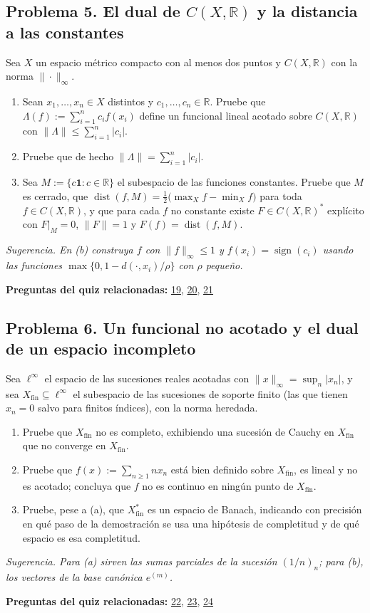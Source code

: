 \documentclass[11pt,a4paper]{article}
\begin{document}
\subsection*{\hypertarget{prob-5}{}Problema 5. El dual de $C(X,\mathbb{R})$ y la distancia a las constantes}
Sea $X$ un espacio métrico compacto con al menos dos puntos y $C(X,\mathbb{R})$ con la norma $\|\cdot\|_\infty$.
\begin{enumerate}[label=(\alph*),leftmargin=2.2em,itemsep=2pt]
\item[(a)] Sean $x_1,\dots,x_n\in X$ distintos y $c_1,\dots,c_n\in\mathbb{R}$. Pruebe que $\Lambda(f):=\sum_{i=1}^{n}c_i f(x_i)$ define un funcional lineal acotado sobre $C(X,\mathbb{R})$ con $\|\Lambda\|\le\sum_{i=1}^{n}|c_i|$.
\item[(b)] Pruebe que de hecho $\|\Lambda\|=\sum_{i=1}^{n}|c_i|$.
\item[(c)] Sea $M:=\{c\mathbf 1:c\in\mathbb{R}\}$ el subespacio de las funciones constantes. Pruebe que $M$ es cerrado, que $\operatorname{dist}(f,M)=\frac12\bigl(\max_X f-\min_X f\bigr)$ para toda $f\in C(X,\mathbb{R})$, y que para cada $f$ no constante existe $F\in C(X,\mathbb{R})^{*}$ explícito con $F|_M=0$, $\|F\|=1$ y $F(f)=\operatorname{dist}(f,M)$.
\end{enumerate}
{\small\itshape Sugerencia. En (b) construya $f$ con $\|f\|_\infty\le1$ y $f(x_i)=\operatorname{sign}(c_i)$ usando las funciones $\max\{0,1-d(\cdot,x_i)/\rho\}$ con $\rho$ pequeño.}
\par{\small\textbf{Preguntas del quiz relacionadas:} \hyperlink{r-19}{19}, \hyperlink{r-20}{20}, \hyperlink{r-21}{21}}
\subsection*{\hypertarget{prob-6}{}Problema 6. Un funcional no acotado y el dual de un espacio incompleto}
Sea $\ell^{\infty}$ el espacio de las sucesiones reales acotadas con $\|x\|_\infty=\sup_n|x_n|$, y sea $X_{\mathrm{fin}}\subseteq\ell^{\infty}$ el subespacio de las sucesiones de soporte finito (las que tienen $x_n=0$ salvo para finitos índices), con la norma heredada.
\begin{enumerate}[label=(\alph*),leftmargin=2.2em,itemsep=2pt]
\item[(a)] Pruebe que $X_{\mathrm{fin}}$ no es completo, exhibiendo una sucesión de Cauchy en $X_{\mathrm{fin}}$ que no converge en $X_{\mathrm{fin}}$.
\item[(b)] Pruebe que $f(x):=\sum_{n\ge1}n x_n$ está bien definido sobre $X_{\mathrm{fin}}$, es lineal y no es acotado; concluya que $f$ no es continuo en ningún punto de $X_{\mathrm{fin}}$.
\item[(c)] Pruebe, pese a (a), que $X_{\mathrm{fin}}^{*}$ es un espacio de Banach, indicando con precisión en qué paso de la demostración se usa una hipótesis de completitud y de qué espacio es esa completitud.
\end{enumerate}
{\small\itshape Sugerencia. Para (a) sirven las sumas parciales de la sucesión $(1/n)_n$; para (b), los vectores de la base canónica $e^{(m)}$.}
\par{\small\textbf{Preguntas del quiz relacionadas:} \hyperlink{r-22}{22}, \hyperlink{r-23}{23}, \hyperlink{r-24}{24}}
\end{document}
